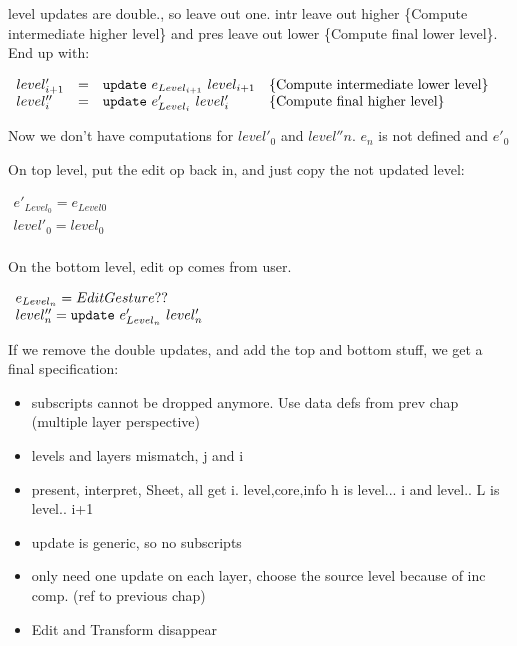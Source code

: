 level updates are double., so leave out one. intr leave out higher \{Compute intermediate higher level\} and pres leave out lower \{Compute final lower level\}. End up with:

\begin{small}\( \begin{array}{lcll} 
level'_{i+1} 	& = & {\tt update}~e_{Level_{i+1}}~level_{i+1}                 & \text{\{Compute intermediate lower level\}}\\
level''_{i} & = & {\tt update}~e'_{Level_{i}}~level'_{i}                 & \text{\{Compute final higher level\}}\\
\end{array}\)
\end{small}

Now we don't have computations for $level'_0$ and $level''{n}$. $e_n$ is not defined and $e'_0$


On top level, put the edit op back in, and just copy the not updated level:

\begin{small}\( \begin{array}{lcll} 
e'_{Level_{0}}  = e_{Level{0}}\\
level'_{0} =  level_{0}\\
\end{array}\)
\end{small}

On the bottom level, edit op comes from user. 

\begin{small}\( \begin{array}{lcll} 
e_{Level_{n}}  = EditGesture ??\\
level''_{n}  =  {\tt update}~e'_{Level_{n}}~level'_{n}\\
\end{array}\)
\end{small}


If we remove the double updates, and add the top and bottom stuff, we get a final specification:

\begin{itemize}
\item subscripts cannot be dropped anymore. Use data defs from prev chap (multiple layer perspective)
\item levels and layers mismatch, j and i
\item present, interpret, Sheet, all get i.  level,core,info h is level... i and level.. L is level.. i+1
\item update is generic, so no subscripts
\item only need one update on each layer, choose the source level because of inc comp. (ref to previous chap)
\item Edit and Transform disappear
\end{itemize}

